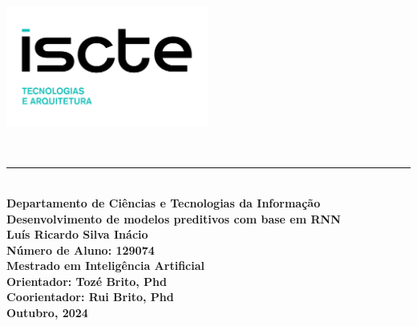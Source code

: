 \begin{titlepage}
	\begin{flushleft}
		\begin{minipage}{\textwidth}
			\vspace{1cm} %
			\includegraphics[width=0.5\textwidth]{ista.png}
		\end{minipage}\\[1cm]
	\end{flushleft}
	\noindent
	\textcolor{barraazul}{\rule{\textwidth}{1mm}} %
	\\[0.5cm]
	{\Large \textbf{\centering Departamento de Ciências e Tecnologias da Informação}}\\[1cm]
	{\Huge \textbf{\centering Desenvolvimento de modelos preditivos com base em RNN}}\\[1.5cm]
	\noindent
	\textbf{Luís Ricardo Silva Inácio}\\
	\textbf{Número de Aluno: 129074}\\[2cm]
	\textbf{Mestrado em Inteligência Artificial}\\[1.5cm]
	\textbf{Orientador: Tozé Brito, Phd}\\
	\textbf{Coorientador: Rui Brito, Phd}\\[3cm]
	\textbf{Outubro, 2024}
\end{titlepage}
